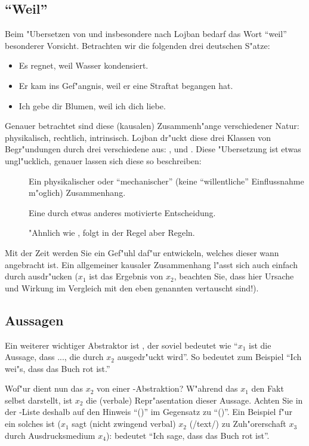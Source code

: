 \subsection{``Weil''}
Beim "Ubersetzen von und insbesondere nach Lojban bedarf das Wort ``weil'' besonderer Vorsicht. Betrachten wir die folgenden drei deutschen
S"atze:
\begin{itemize}
\item Es regnet, weil Wasser kondensiert.
\item Er kam ins Gef"angnis, weil er eine Straftat begangen hat.
\item Ich gebe dir Blumen, weil ich dich liebe.
\end{itemize}
Genauer betrachtet sind diese (kausalen) Zusammenh"ange verschiedener Natur: physikalisch, rechtlich, intrinsisch. Lojban dr"uckt diese drei
Klassen von Begr"undungen durch drei verschiedene  aus: ,  und . Diese "Ubersetzung ist etwas ungl"ucklich, genauer lassen sich diese  so beschreiben:
\begin{description}
\item[] Ein physikalischer oder ``mechanischer'' (keine ``willentliche'' Einflussnahme m"oglich) Zusammenhang.
\item[] Eine durch etwas anderes motivierte Entscheidung.
\item[] "Ahnlich wie , folgt in der Regel aber Regeln.
\end{description}
Mit der Zeit werden Sie ein Gef"uhl daf"ur entwickeln, welches dieser  wann angebracht ist. Ein allgemeiner kausaler Zusammenhang
l"asst sich auch einfach durch  ausdr"ucken ($x_1$ ist das Ergebnis von $x_2$, beachten Sie, dass hier Ursache und Wirkung im
Vergleich mit den eben genannten  vertauscht sind!).

\subsection{Aussagen}
Ein weiterer wichtiger Abstraktor ist , der soviel bedeutet wie ``$x_1$ ist die Aussage, dass ..., die durch $x_2$ ausgedr"uckt wird''.
So bedeutet zum Beispiel  ``Ich wei"s, dass das Buch rot ist.''

Wof"ur dient nun das $x_2$ von einer -Abstraktion? W"ahrend das $x_1$ den Fakt selbst darstellt, ist $x_2$ die (verbale) 
Repr"asentation dieser Aussage. Achten Sie in der -Liste deshalb auf den Hinweis ``()'' im Gegensatz zu ``()''.
Ein Beispiel f"ur ein solches  ist  ($x_1$ sagt (nicht zwingend verbal) $x_2$ (/text/) zu Zuh"orerschaft $x_3$ durch
Ausdrucksmedium $x_4$):  bedeutet ``Ich sage, dass das Buch rot ist''.

